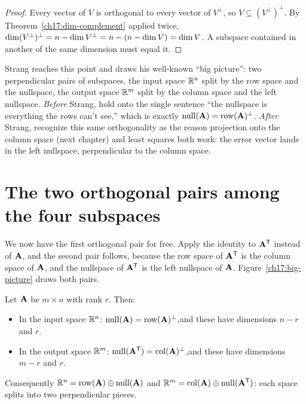 \begin{proof}
Every vector of $V$ is orthogonal to every vector of $V^\perp$, so $V\subseteq (V^\perp)^\perp$.
By Theorem~\ref{ch17:dim-complement} applied twice, $\operatorname{dim} (V^\perp)^\perp = n-\operatorname{dim} V^\perp
= n-(n-\operatorname{dim} V)=\operatorname{dim} V$. A subspace contained in another of the same dimension must equal it.
\end{proof}

\begin{strangbox}
Strang reaches this point and draws his well-known ``big picture'': two perpendicular pairs of
subspaces, the input space $\mathbb{R}^n$ split by the row space and the nullspace, the output space
$\mathbb{R}^m$ split by the column space and the left nullspace. \emph{Before} Strang, hold onto the
single sentence ``the nullspace is everything the rows can't see,'' which is exactly
$\operatorname{null}(\mathbf{A})=\operatorname{row}(\mathbf{A})^\perp$. \emph{After} Strang, recognize this same orthogonality as the
reason projection onto the column space (next chapter) and least squares both work: the error
vector lands in the left nullspace, perpendicular to the column space.
\end{strangbox}

\section{The two orthogonal pairs among the four subspaces}

We now have the first orthogonal pair for free. Apply the identity to $\mathbf{A}^{\mathsf{T}}$ instead of
$\mathbf{A}$, and the second pair follows, because the row space of $\mathbf{A}^{\mathsf{T}}$ is the column space
of $\mathbf{A}$, and the nullspace of $\mathbf{A}^{\mathsf{T}}$ is the left nullspace of $\mathbf{A}$.
Figure~\ref{ch17:big-picture} draws both pairs.

\begin{theorem}\label{ch17:two-pairs}
Let $\mathbf{A}$ be $m\times n$ with rank $r$. Then:
\begin{itemize}
  \item In the input space $\mathbb{R}^n$:\quad
        $\operatorname{null}(\mathbf{A}) = \operatorname{row}(\mathbf{A})^{\perp}$,\quad and these have dimensions $n-r$ and $r$.
  \item In the output space $\mathbb{R}^m$:\quad
        $\operatorname{null}(\mathbf{A}^{\mathsf{T}}) = \operatorname{col}(\mathbf{A})^{\perp}$,\quad and these have dimensions $m-r$ and $r$.
\end{itemize}
Consequently $\mathbb{R}^n = \operatorname{row}(\mathbf{A})\oplus\operatorname{null}(\mathbf{A})$ and
$\mathbb{R}^m = \operatorname{col}(\mathbf{A})\oplus\operatorname{null}(\mathbf{A}^{\mathsf{T}})$: each space splits into two perpendicular pieces.
\end{theorem}

